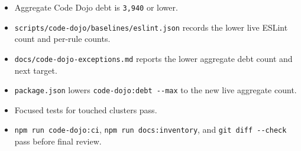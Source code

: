 \begin{itemize}
\tightlist
\item
  Aggregate Code Dojo debt is \texttt{3\allowbreak{},\allowbreak{}9\allowbreak{}4\allowbreak{}0} or lower.
\item
  \texttt{s\allowbreak{}c\allowbreak{}r\allowbreak{}i\allowbreak{}p\allowbreak{}t\allowbreak{}s\allowbreak{}/\allowbreak{}c\allowbreak{}o\allowbreak{}d\allowbreak{}e\allowbreak{}-\allowbreak{}d\allowbreak{}o\allowbreak{}j\allowbreak{}o\allowbreak{}/\allowbreak{}b\allowbreak{}a\allowbreak{}s\allowbreak{}e\allowbreak{}l\allowbreak{}i\allowbreak{}n\allowbreak{}e\allowbreak{}s\allowbreak{}/\allowbreak{}e\allowbreak{}s\allowbreak{}l\allowbreak{}i\allowbreak{}n\allowbreak{}t\allowbreak{}.\allowbreak{}j\allowbreak{}s\allowbreak{}o\allowbreak{}n} records the lower live ESLint count and per-rule counts.
\item
  \texttt{d\allowbreak{}o\allowbreak{}c\allowbreak{}s\allowbreak{}/\allowbreak{}c\allowbreak{}o\allowbreak{}d\allowbreak{}e\allowbreak{}-\allowbreak{}d\allowbreak{}o\allowbreak{}j\allowbreak{}o\allowbreak{}-\allowbreak{}e\allowbreak{}x\allowbreak{}c\allowbreak{}e\allowbreak{}p\allowbreak{}t\allowbreak{}i\allowbreak{}o\allowbreak{}n\allowbreak{}s\allowbreak{}.\allowbreak{}m\allowbreak{}d} reports the lower aggregate debt count and next target.
\item
  \texttt{p\allowbreak{}a\allowbreak{}c\allowbreak{}k\allowbreak{}a\allowbreak{}g\allowbreak{}e\allowbreak{}.\allowbreak{}j\allowbreak{}s\allowbreak{}o\allowbreak{}n} lowers \texttt{c\allowbreak{}o\allowbreak{}d\allowbreak{}e\allowbreak{}-\allowbreak{}d\allowbreak{}o\allowbreak{}j\allowbreak{}o\allowbreak{}:\allowbreak{}d\allowbreak{}e\allowbreak{}b\allowbreak{}t\allowbreak{} \allowbreak{}-\allowbreak{}-\allowbreak{}m\allowbreak{}a\allowbreak{}x} to the new live aggregate count.
\item
  Focused tests for touched clusters pass.
\item
  \texttt{n\allowbreak{}p\allowbreak{}m\allowbreak{} \allowbreak{}r\allowbreak{}u\allowbreak{}n\allowbreak{} \allowbreak{}c\allowbreak{}o\allowbreak{}d\allowbreak{}e\allowbreak{}-\allowbreak{}d\allowbreak{}o\allowbreak{}j\allowbreak{}o\allowbreak{}:\allowbreak{}c\allowbreak{}i}, \texttt{n\allowbreak{}p\allowbreak{}m\allowbreak{} \allowbreak{}r\allowbreak{}u\allowbreak{}n\allowbreak{} \allowbreak{}d\allowbreak{}o\allowbreak{}c\allowbreak{}s\allowbreak{}:\allowbreak{}i\allowbreak{}n\allowbreak{}v\allowbreak{}e\allowbreak{}n\allowbreak{}t\allowbreak{}o\allowbreak{}r\allowbreak{}y}, and \texttt{g\allowbreak{}i\allowbreak{}t\allowbreak{} \allowbreak{}d\allowbreak{}i\allowbreak{}f\allowbreak{}f\allowbreak{} \allowbreak{}-\allowbreak{}-\allowbreak{}c\allowbreak{}h\allowbreak{}e\allowbreak{}c\allowbreak{}k} pass before final review.
\end{itemize}

